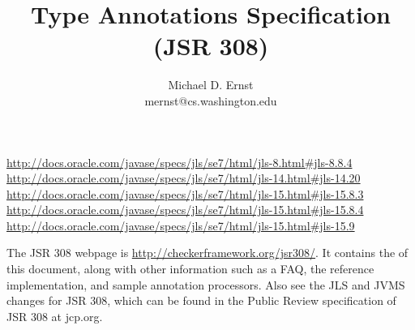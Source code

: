 \documentclass[10pt]{article}
\title{Type Annotations Specification (JSR 308)}
\author{Michael D. Ernst \\
{\ttfamily mernst@cs.washington.edu}
}
\begin{document}
\def\codesize{\smaller}
\newcommand{\code}[1]{{\ifmmode{\mbox{\codesize\ttfamily{#1}}}\else{\codesize\ttfamily #1}\fi}}
\def\<#1>{\code{#1}}
\newcommand{\codesmall}[1]{\ifmmode{\mbox{\small\ttfamily{#1}}}\else{\small\ttfamily #1}\fi}
\newcommand{\codefootnotesize}[1]{\ifmmode{\mbox{\footnotesize\ttfamily{#1}}}\else{\footnotesize\ttfamily #1}\fi}
\newcommand{\myurl}[1]{{\codesize\url{#1}}}





\makeatletter
\def\topfigrule{\kern3\p@ \hrule \kern -3.4\p@} %
\def\botfigrule{\kern-3\p@ \hrule \kern 2.6\p@} %
\def\dblfigrule{\kern3\p@ \hrule \kern -3.4\p@} %
\makeatother


\urldef{\jlsEightEightFour}\url{http://docs.oracle.com/javase/specs/jls/se7/html/jls-8.html#jls-8.8.4}
\urldef{\jlsFourteenTwenty}\url{http://docs.oracle.com/javase/specs/jls/se7/html/jls-14.html#jls-14.20}
\urldef{\jlsFifteenEightThree}\url{http://docs.oracle.com/javase/specs/jls/se7/html/jls-15.html#jls-15.8.3}
\urldef{\jlsFifteenEightFour}\url{http://docs.oracle.com/javase/specs/jls/se7/html/jls-15.html#jls-15.8.4}
\urldef{\jlsFifteenNine}\url{http://docs.oracle.com/javase/specs/jls/se7/html/jls-15.html#jls-15.9}



\maketitle

The JSR 308 webpage is \myurl{http://checkerframework.org/jsr308/}.
It contains the
of this document, along
with other information such as a FAQ, the reference implementation, and
sample annotation processors.
Also see the JLS and JVMS changes for JSR 308, which can be found in
the Public Review specification of JSR 308 at jcp.org.
\end{document}
